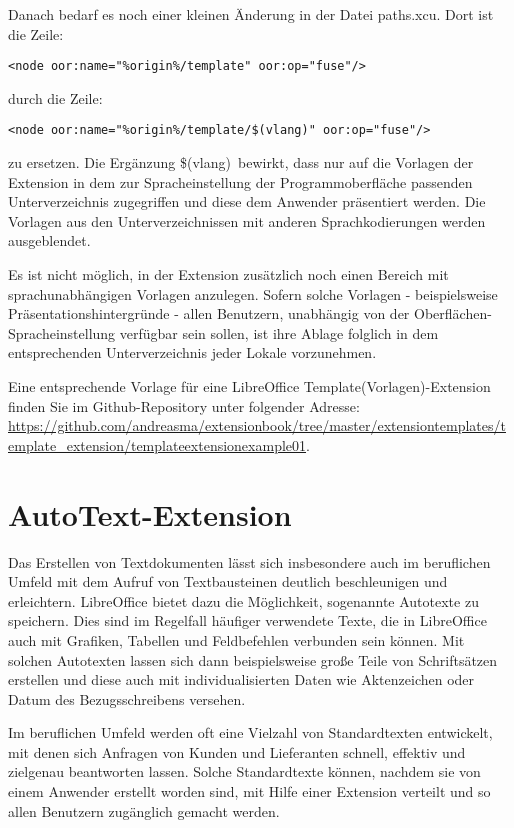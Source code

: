 \documentclass[a4paper,10pt,pagesize,titlepage]{scrbook}
\begin{document}
Danach bedarf es noch einer kleinen Änderung in der Datei \glqq paths.xcu\grqq. Dort ist die Zeile:
\begin{lstlisting}
<node oor:name="%origin%/template" oor:op="fuse"/>
\end{lstlisting}

durch die Zeile:
\begin{lstlisting}
<node oor:name="%origin%/template/$(vlang)" oor:op="fuse"/>
\end{lstlisting}

zu ersetzen. Die Ergänzung \glqq \$(vlang)\grqq~bewirkt, dass nur auf die Vorlagen der Extension in dem zur Spracheinstellung der Programmoberfläche passenden Unterverzeichnis zugegriffen und diese dem Anwender präsentiert werden. Die Vorlagen aus den Unterverzeichnissen mit anderen Sprachkodierungen werden ausgeblendet.

Es ist nicht möglich, in der Extension zusätzlich noch einen Bereich mit sprachunabhängigen Vorlagen anzulegen. Sofern solche Vorlagen - beispielsweise Präsentationshintergründe - allen Benutzern, unabhängig von der Oberflächen-Spracheinstellung verfügbar sein sollen, ist ihre Ablage folglich in dem entsprechenden Unterverzeichnis jeder Lokale vorzunehmen.

Eine entsprechende Vorlage für eine LibreOffice Template(Vorlagen)-Extension finden Sie im Github-Repository unter folgender Adresse:
\url{https://github.com/andreasma/extensionbook/tree/master/extensiontemplates/template_extension/templateextensionexample01}.

\section{AutoText-Extension}

Das Erstellen von Textdokumenten lässt sich insbesondere auch im beruflichen Umfeld mit dem Aufruf von Textbausteinen deutlich beschleunigen und erleichtern. LibreOffice bietet dazu die Möglichkeit, sogenannte Autotexte zu speichern. Dies sind im Regelfall häufiger verwendete Texte, die in LibreOffice auch mit Grafiken, Tabellen und Feldbefehlen verbunden sein können. Mit solchen Autotexten lassen sich dann beispielsweise große Teile von Schriftsätzen erstellen und diese auch mit individualisierten Daten wie Aktenzeichen oder Datum des Bezugsschreibens versehen.

Im beruflichen Umfeld werden oft eine Vielzahl von Standardtexten entwickelt, mit denen sich Anfragen von Kunden und Lieferanten schnell, effektiv und zielgenau beantworten lassen. Solche Standardtexte können, nachdem sie von einem Anwender erstellt worden sind, mit Hilfe einer Extension verteilt und so allen Benutzern zugänglich gemacht werden.
\end{document}
